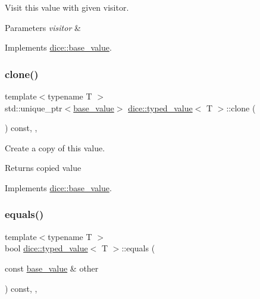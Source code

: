 Visit this value with given visitor. 


\begin{DoxyParams}{Parameters}
{\em visitor} & \\
\hline
\end{DoxyParams}


Implements \mbox{\hyperlink{classdice_1_1base__value_a8ab0acd9a7b10035a1c8f8a0f05b40b4}{dice\+::base\+\_\+value}}.

\mbox{\label{classdice_1_1typed__value_a54490141b25b17213989fd2e859b4f59}} 
\subsubsection{\texorpdfstring{clone()}{clone()}}
{\footnotesize\ttfamily template$<$typename T $>$ \\
std\+::unique\+\_\+ptr$<$\mbox{\hyperlink{classdice_1_1base__value}{base\+\_\+value}}$>$ \mbox{\hyperlink{classdice_1_1typed__value}{dice\+::typed\+\_\+value}}$<$ T $>$\+::clone (\begin{DoxyParamCaption}{ }\end{DoxyParamCaption}) const\hspace{0.3cm}{\ttfamily [inline]}, {\ttfamily [override]}, {\ttfamily [virtual]}}



Create a copy of this value. 

\begin{DoxyReturn}{Returns}
copied value 
\end{DoxyReturn}


Implements \mbox{\hyperlink{classdice_1_1base__value_a58335a522dda6d97332f938ead90aa15}{dice\+::base\+\_\+value}}.

\mbox{\label{classdice_1_1typed__value_aeb5c87839a5e3ecb7beac6abc05e6701}} 
\subsubsection{\texorpdfstring{equals()}{equals()}}
{\footnotesize\ttfamily template$<$typename T $>$ \\
bool \mbox{\hyperlink{classdice_1_1typed__value}{dice\+::typed\+\_\+value}}$<$ T $>$\+::equals (\begin{DoxyParamCaption}\item[{const \mbox{\hyperlink{classdice_1_1base__value}{base\+\_\+value}} \&}]{other }\end{DoxyParamCaption}) const\hspace{0.3cm}{\ttfamily [inline]}, {\ttfamily [override]}, {\ttfamily [virtual]}}



